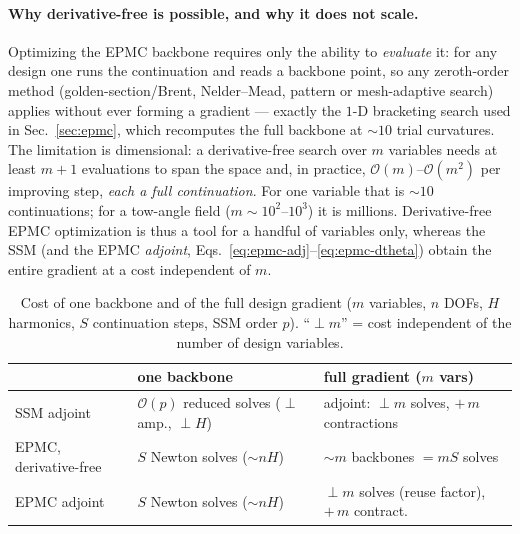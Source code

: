 \documentclass[11pt]{article}
\begin{document}
\paragraph{Why derivative-free is possible, and why it does not scale.}
Optimizing the EPMC backbone requires only the ability to \emph{evaluate} it: for
any design one runs the continuation and reads a backbone point, so any zeroth-order
method (golden-section/Brent, Nelder--Mead, pattern or mesh-adaptive search) applies
without ever forming a gradient --- exactly the $1$-D bracketing search used in
Sec.~\ref{sec:epmc}, which recomputes the full backbone at $\sim\!10$ trial
curvatures. The limitation is dimensional: a derivative-free search over $m$
variables needs at least $m{+}1$ evaluations to span the space and, in practice,
$\mathcal O(m)$--$\mathcal O(m^{2})$ per improving step, \emph{each a full
continuation}. For one variable that is $\sim\!10$ continuations; for a tow-angle
field ($m\sim10^{2}$--$10^{3}$) it is millions. Derivative-free EPMC optimization is
thus a tool for a handful of variables only, whereas the SSM (and the EPMC
\emph{adjoint}, Eqs.~\eqref{eq:epmc-adj}--\eqref{eq:epmc-dtheta}) obtain the entire
gradient at a cost independent of $m$.

\begin{table}[t]
\centering\footnotesize
\caption{Cost of one backbone and of the full design gradient ($m$ variables, $n$
DOFs, $H$ harmonics, $S$ continuation steps, SSM order $p$). ``$\perp m$'' = cost
independent of the number of design variables.}
\label{tab:cost}
\begin{tabular}{@{}lll@{}}
\toprule
& one backbone & full gradient ($m$ vars)\\ \midrule
SSM adjoint            & $\mathcal O(p)$ reduced solves ($\perp$ amp., $\perp H$) & adjoint: $\perp m$ solves, $+\,m$ contractions\\
EPMC, derivative-free  & $S$ Newton solves ($\sim\!nH$)              & $\sim\!m$ backbones $=mS$ solves\\
EPMC adjoint           & $S$ Newton solves ($\sim\!nH$)             & $\perp m$ solves (reuse factor), $+\,m$ contract.\\
\bottomrule
\end{tabular}
\end{table}
\end{document}
